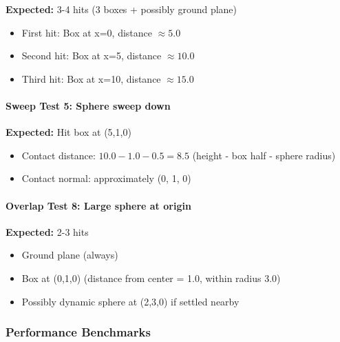 \textbf{Expected:} 3-4 hits (3 boxes + possibly ground plane)
\begin{itemize}
    \item First hit: Box at x=0, distance $\approx 5.0$
    \item Second hit: Box at x=5, distance $\approx 10.0$
    \item Third hit: Box at x=10, distance $\approx 15.0$
\end{itemize}

\paragraph{Sweep Test 5: Sphere sweep down}

\textbf{Expected:} Hit box at (5,1,0)
\begin{itemize}
    \item Contact distance: $10.0 - 1.0 - 0.5 = 8.5$ (height - box half - sphere radius)
    \item Contact normal: approximately (0, 1, 0)
\end{itemize}

\paragraph{Overlap Test 8: Large sphere at origin}

\textbf{Expected:} 2-3 hits
\begin{itemize}
    \item Ground plane (always)
    \item Box at (0,1,0) (distance from center = 1.0, within radius 3.0)
    \item Possibly dynamic sphere at (2,3,0) if settled nearby
\end{itemize}

\subsubsection{Performance Benchmarks}

